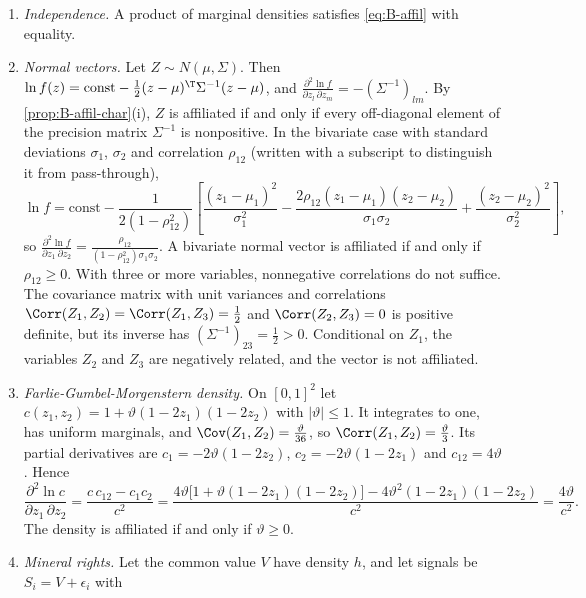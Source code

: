 \begin{example}\label{ex:B-affil-examples}
\leavevmode
\begin{enumerate}[label=(\alph*)]
  \item \emph{Independence.} A product of marginal densities satisfies \eqref{eq:B-affil} with equality.
  \item \emph{Normal vectors.} Let $Z \sim N(\mu, \Sigma)$. Then $\ln f(z) = \text{const} - \frac{1}{2}(z - \mu)^\T\Sigma^{-1}(z - \mu)$, and
  $\frac{\partial^2\ln f}{\partial z_l\,\partial z_m} = -(\Sigma^{-1})_{lm}$. By \cref{prop:B-affil-char}(i), $Z$ is affiliated if and only if
  every off-diagonal element of the precision matrix $\Sigma^{-1}$ is nonpositive. In the bivariate case with standard
  deviations $\sigma_1$, $\sigma_2$ and correlation $\rho_{12}$ (written with a subscript to distinguish it from
  pass-through),
  \[
    \ln f = \text{const} - \frac{1}{2(1 - \rho_{12}^2)}\left[\frac{(z_1 - \mu_1)^2}{\sigma_1^2} - \frac{2\rho_{12}(z_1 - \mu_1)(z_2 - \mu_2)}{\sigma_1\sigma_2} + \frac{(z_2 - \mu_2)^2}{\sigma_2^2}\right],
  \]
  so $\frac{\partial^2\ln f}{\partial z_1\,\partial z_2} = \frac{\rho_{12}}{(1 - \rho_{12}^2)\sigma_1\sigma_2}$. A bivariate normal vector is affiliated
  if and only if $\rho_{12} \geq 0$. With three or more variables, nonnegative correlations do not suffice. The
  covariance matrix with unit variances and correlations $\Corr(Z_1, Z_2) = \Corr(Z_1, Z_3) = \frac{1}{2}$ and
  $\Corr(Z_2, Z_3) = 0$ is positive definite, but its inverse has $(\Sigma^{-1})_{23} = \frac{1}{2} > 0$. Conditional on $Z_1$, the
  variables $Z_2$ and $Z_3$ are negatively related, and the vector is not affiliated.
  \item \emph{Farlie-Gumbel-Morgenstern density.} On $[0, 1]^2$ let $c(z_1, z_2) = 1 + \vartheta(1 - 2z_1)(1 - 2z_2)$ with
  $|\vartheta| \leq 1$. It integrates to one, has uniform marginals, and $\Cov(Z_1, Z_2) = \frac{\vartheta}{36}$, so
  $\Corr(Z_1, Z_2) = \frac{\vartheta}{3}$. Its partial derivatives are $c_1 = -2\vartheta(1 - 2z_2)$, $c_2 = -2\vartheta(1 - 2z_1)$
  and $c_{12} = 4\vartheta$. Hence
  \[
    \frac{\partial^2\ln c}{\partial z_1\,\partial z_2} = \frac{c\,c_{12} - c_1c_2}{c^2}
    = \frac{4\vartheta\bigl[1 + \vartheta(1 - 2z_1)(1 - 2z_2)\bigr] - 4\vartheta^2(1 - 2z_1)(1 - 2z_2)}{c^2} = \frac{4\vartheta}{c^2}.
  \]
  The density is affiliated if and only if $\vartheta \geq 0$.
  \item \emph{Mineral rights.} Let the common value $V$ have density $h$, and let signals be $S_i = V + \epsilon_i$ with

\end{enumerate}
\end{example}
